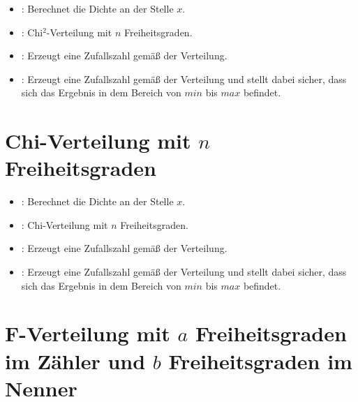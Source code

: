 \begin{itemize}

\item
{}:
Berechnet die Dichte an der Stelle $x$.

\item
{}:
Chi$^2$-Verteilung mit $n$ Freiheitsgraden.

\item
{}:
Erzeugt eine Zufallszahl gemäß der Verteilung.

\item
{}:
Erzeugt eine Zufallszahl gemäß der Verteilung und stellt dabei sicher, dass sich das Ergebnis in dem Bereich von $min$ bis $max$ befindet.

\end{itemize}



\section{Chi-Verteilung mit \texorpdfstring{$n$}{n} Freiheitsgraden}

\begin{itemize}

\item
{}:
Berechnet die Dichte an der Stelle $x$.

\item
{}:
Chi-Verteilung mit $n$ Freiheitsgraden.

\item
{}:
Erzeugt eine Zufallszahl gemäß der Verteilung.

\item
{}:
Erzeugt eine Zufallszahl gemäß der Verteilung und stellt dabei sicher, dass sich das Ergebnis in dem Bereich von $min$ bis $max$ befindet.

\end{itemize}



\section{F-Verteilung mit \texorpdfstring{$a$}{a} Freiheitsgraden im Zähler und \texorpdfstring{$b$}{b} Freiheitsgraden im Nenner}

